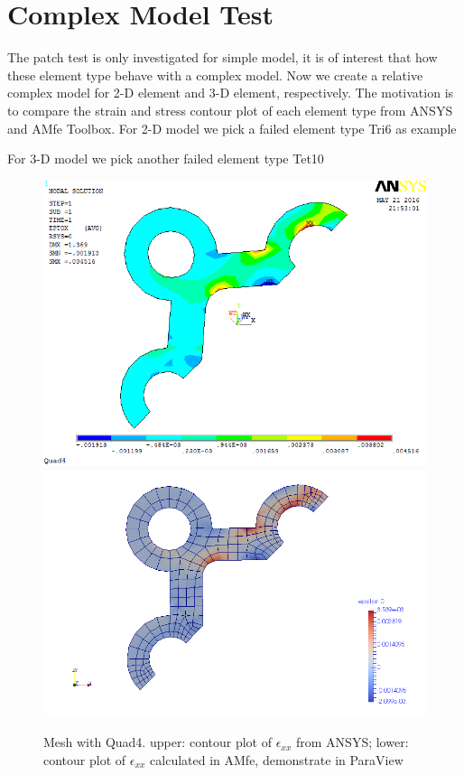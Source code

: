 \section{Complex Model Test}
The patch test is only investigated for simple model, it is of interest that how these element type behave with a complex model. Now we create a relative complex model for 2-D element and 3-D element, respectively. The motivation is to compare the strain and stress contour plot of each element type from ANSYS and AMfe Toolbox. For 2-D model we pick a failed element type Tri6 as example



For 3-D model we pick another failed element type Tet10

\begin{figure}[htbp]
	\begin{center}
		\includegraphics[width=13cm,clip]{Quad4_Exx.png} 		
		\includegraphics[width=13cm,clip]{Quad4_Exx_P.png} 		
		\caption{Mesh with Quad4. upper: contour plot of $\epsilon_{xx}$ from ANSYS; lower: contour plot of $\epsilon_{xx}$ calculated in AMfe, demonstrate in ParaView} \label{fig: Quad4_Exx}
	\end{center}
\end{figure}

